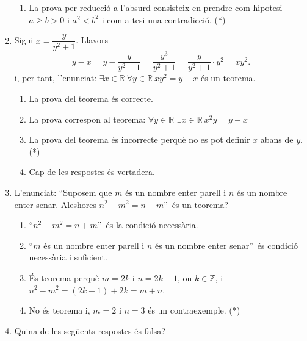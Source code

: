 \begin{enumerate}
\begin{enumerate}
\item La prova per reducci\'{o} a l'absurd consisteix en prendre com hipotesi
$a\geq b>0$ i $a^{2}<b^{2}$ i com a tesi una contradicci\'{o}. (*)
\end{enumerate}

\item Sigui $x=\dfrac{y}{y^{2}+1}$. Llavors
\[
y-x=y-\dfrac{y}{y^{2}+1}=\dfrac{y^{3}}{y^{2}+1}=\dfrac{y}{y^{2}+1}\cdot
y^{2}=xy^{2}\text{.}%
\]
i, per tant, l'enunciat: $\exists x\in\mathbb{R~}\forall y\in\mathbb{R~}%
xy^{2}=y-x$ \'{e}s un teorema.

\begin{enumerate}
\item La prova del teorema \'{e}s correcte.

\item La prova correspon al teorema: $\forall y\in\mathbb{R}$ $\exists
x\in\mathbb{R~}x^{2}y=y-x$

\item La prova del teorema \'{e}s incorrecte perqu\`{e} no es pot definir $x$
abans de $y$. (*)

\item Cap de les respostes \'{e}s vertadera.
\end{enumerate}

\item L'enunciat: \textquotedblleft Suposem que $m$ \'{e}s un nombre enter
parell i $n$ \'{e}s un nombre enter senar. Aleshores $n^{2}-m^{2}%
=n+m$\textquotedblright\ \'{e}s un teorema?

\begin{enumerate}
\item \textquotedblleft$n^{2}-m^{2}=n+m$\textquotedblright\ \'{e}s la
condici\'{o} necess\`{a}ria.

\item \textquotedblleft$m$ \'{e}s un nombre enter parell i $n$ \'{e}s un
nombre enter senar\textquotedblright\ \'{e}s condici\'{o} necess\`{a}ria i suficient.

\item \'{E}s teorema perqu\`{e} $m=2k$ i $n=2k+1$, on $k\in\mathbb{Z}$, i
$n^{2}-m^{2}=\left(  2k+1\right)  +2k=m+n$.

\item No \'{e}s teorema i, $m=2$ i $n=3$ \'{e}s un contraexemple. (*)
\end{enumerate}

\item Quina de les seg\"{u}ents respostes \'{e}s falsa?


\end{enumerate}
